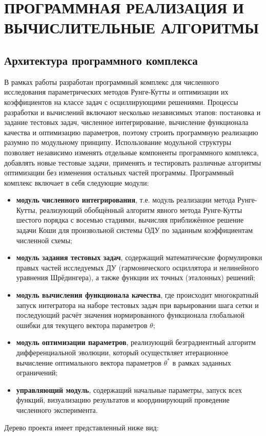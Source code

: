 \newpage
\pagestyle{plain}

\section{\centering ПРОГРАММНАЯ РЕАЛИЗАЦИЯ И ВЫЧИСЛИТЕЛЬНЫЕ АЛГОРИТМЫ}

\subsection{Архитектура программного комплекса}
В рамках работы разработан программный комплекс для численного исследования параметрических методов Рунге-Кутты и оптимизации их коэффициентов на классе задач с осциллирующими решениями. Процессы разработки и вычислений включают несколько независимых этапов: постановка и задание тестовых задач, численное интегрирование, вычисление функционала качества и оптимизацию параметров, поэтому строить программную реализацию разумно по модульному принципу. Использование модульной структуры позволяет независимо изменять отдельные компоненты программного комплекса, добавлять новые тестовые задачи, применять и тестировать различные алгоритмы оптимизации без изменения остальных частей программы. 
Программный комплекс включает в себя следующие модули:
\begin{itemize}
	\item \textbf{модуль численного интегрирования}, т.е. модуль реализации метода Рунге-Кутты, реализующий обобщённый алгоритм явного метода Рунге-Кутты шестого порядка с восемью стадиями, вычисляя приближённое решение задачи Коши для произвольной системы ОДУ по заданным коэффициентам численной схемы;
	\item \textbf{модуль задания тестовых задач}, содержащий математические формулировки правых частей исследуемых ДУ (гармонического осциллятора и нелинейного уравнения Шрёдингера), а также функции их точных (эталонных) решений;
	\item \textbf{модуль вычисления функционала качества}, где происходит многократный запуск интегратора на наборе тестовых задач при варьировании шага сетки и последующий расчёт значения нормированного функционала глобальной ошибки для текущего вектора параметров $\theta$;
	\item \textbf{модуль оптимизации параметров}, реализующий безградиентный алгоритм дифференциальной эволюции, который осуществляет итерационное вычисление оптимального вектора параметров $\theta^*$ в рамках заданных ограничений;
	\item \textbf{управляющий модуль}, содержащий начальные параметры, запуск всех функций, визуализацию результатов и координирующий проведение численного эксперимента.
\end{itemize}
Дерево проекта имеет представленный ниже вид:

